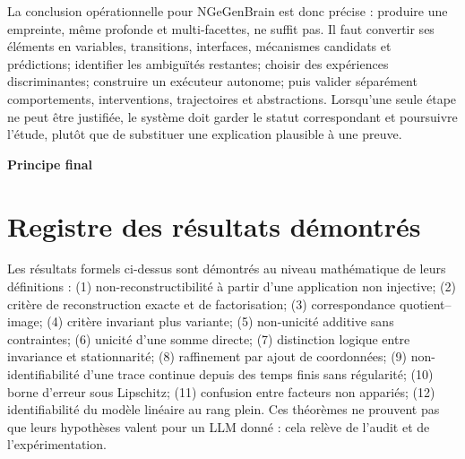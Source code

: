 \documentclass[11pt,oneside]{book}
\theoremstyle{definition}
\theoremstyle{remark}
\newcommand{\1}{\mathbf 1}
\begin{document}
La conclusion opérationnelle pour NGeGenBrain est donc précise : produire une empreinte, même profonde et multi-facettes, ne suffit pas. Il faut convertir ses éléments en variables, transitions, interfaces, mécanismes candidats et prédictions; identifier les ambiguïtés restantes; choisir des expériences discriminantes; construire un exécuteur autonome; puis valider séparément comportements, interventions, trajectoires et abstractions. Lorsqu'une seule étape ne peut être justifiée, le système doit garder le statut correspondant et poursuivre l'étude, plutôt que de substituer une explication plausible à une preuve.

\bigskip
\begin{center}
\textbf{Principe final}\par\medskip
{}
\end{center}

\section*{Registre des résultats démontrés}
Les résultats formels ci-dessus sont démontrés au niveau mathématique de leurs définitions : (1) non-reconstructibilité à partir d'une application non injective; (2) critère de reconstruction exacte et de factorisation; (3) correspondance quotient--image; (4) critère invariant plus variante; (5) non-unicité additive sans contraintes; (6) unicité d'une somme directe; (7) distinction logique entre invariance et stationnarité; (8) raffinement par ajout de coordonnées; (9) non-identifiabilité d'une trace continue depuis des temps finis sans régularité; (10) borne d'erreur sous Lipschitz; (11) confusion entre facteurs non appariés; (12) identifiabilité du modèle linéaire au rang plein. Ces théorèmes ne prouvent pas que leurs hypothèses valent pour un LLM donné : cela relève de l'audit et de l'expérimentation.
\end{document}
